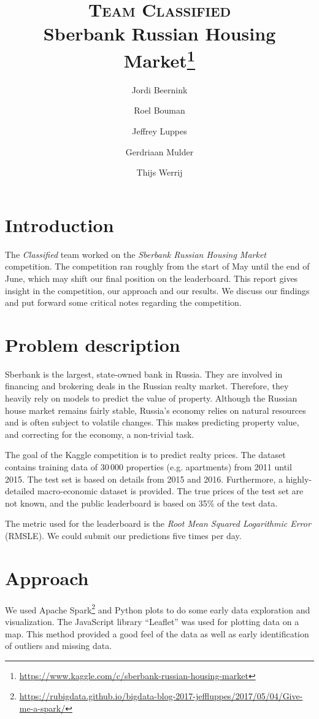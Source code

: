 \documentclass[a4paper,11pt,twocolumn]{article}
\title{\textsc{Team Classified} \\ \small{Sberbank Russian Housing
Market\footnote{\url{https://www.kaggle.com/c/sberbank-russian-housing-market}}}}
\author{Jordi Beernink \and Roel Bouman \and Jeffrey Luppes \and Gerdriaan Mulder \and Thijs Werrij}
\begin{document}
\maketitle

\section{Introduction}
The \emph{Classified} team worked on the \emph{Sberbank Russian Housing Market}
competition. The competition ran roughly from the start of May until the end of
June, which may shift our final position on the leaderboard. This report gives
insight in the competition, our approach and our results. We discuss our
findings and put forward some critical notes regarding the competition.

\section{Problem description}
Sberbank is the largest, state-owned bank in Russia. They are involved in
financing and brokering deals in the Russian realty market. Therefore, they
heavily rely on models to predict the value of property. Although the Russian
house market remains fairly stable, Russia's economy relies on natural resources
and is often subject to volatile changes. This makes predicting
property value, and correcting for the economy, a non-trivial task.

The goal of the Kaggle competition is to predict realty prices. The dataset
contains training data of 30\,000 properties (e.g. apartments) from 2011 until
2015. The test set is based on details from 2015 and 2016. Furthermore, a
highly-detailed macro-economic dataset is provided. The true prices of the test
set are not known, and the public leaderboard is based on 35\% of the test data.

The metric used for the leaderboard is the \emph{Root Mean Squared
Logarithmic Error} (\mbox{RMSLE}). We could submit our predictions five times
per day.

\section{Approach}

We used Apache
Spark\footnote{\url{https://rubigdata.github.io/bigdata-blog-2017-jeffluppes/2017/05/04/Give-me-a-spark/}}
and Python plots to do some early data exploration and visualization. The
JavaScript library ``Leaflet'' was used for plotting data on a map. This method
provided a good feel of the data as well as early identification of outliers and
missing data.
\end{document}
